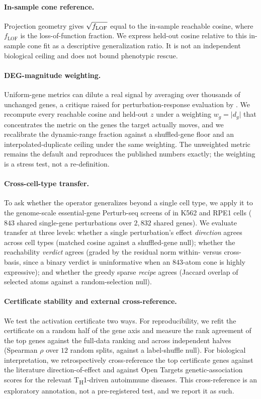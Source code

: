 \paragraph{In-sample cone reference.} Projection geometry gives
$\sqrt{\smash[b]{f_{\mathrm{LOF}}}}$ equal to the in-sample reachable cosine, where
$f_{\mathrm{LOF}}$ is the loss-of-function fraction. We express held-out cosine relative to
this in-sample cone fit as a descriptive generalization ratio. It is not an independent
biological ceiling and does not bound phenotypic rescue.

\paragraph{DEG-magnitude weighting.} Uniform-gene metrics can dilute a real signal by
averaging over thousands of unchanged genes, a critique raised for perturbation-response
evaluation by \citet{Mejia2025}. We recompute every reachable cosine and held-out $z$ under a
weighting $w_g=\lvert d_g\rvert$ that concentrates the metric on the genes the target actually
moves, and we recalibrate the dynamic-range fraction against a shuffled-gene floor and an
interpolated-duplicate ceiling under the same weighting. The unweighted metric remains the
default and reproduces the published numbers exactly; the weighting is a stress test, not a
re-definition.

\paragraph{Cross-cell-type transfer.} To ask whether the operator generalizes beyond a single
cell type, we apply it to the genome-scale essential-gene Perturb-seq screens of
\citet{Replogle2022} in K562 and RPE1 cells ($843$ shared single-gene perturbations over
$2{,}832$ shared genes). We evaluate transfer at three levels: whether a single
perturbation's effect \emph{direction} agrees across cell types (matched cosine against a
shuffled-gene null); whether the reachability \emph{verdict} agrees (graded by the residual
norm within- versus cross-basis, since a binary verdict is uninformative when an $843$-atom
cone is highly expressive); and whether the greedy sparse \emph{recipe} agrees (Jaccard overlap of
selected atoms against a random-selection null).

\paragraph{Certificate stability and external cross-reference.} We test the activation
certificate two ways. For reproducibility, we refit the certificate on a random half of the
gene axis and measure the rank agreement of the top genes against the full-data ranking and
across independent halves (Spearman $\rho$ over $12$ random splits, against a label-shuffle
null). For biological interpretation, we retrospectively cross-reference the top certificate
genes against the literature direction-of-effect and against Open Targets genetic-association
scores for the relevant T\textsubscript{H}1-driven autoimmune diseases. This cross-reference is
an exploratory annotation, not a pre-registered test, and we report it as such.

